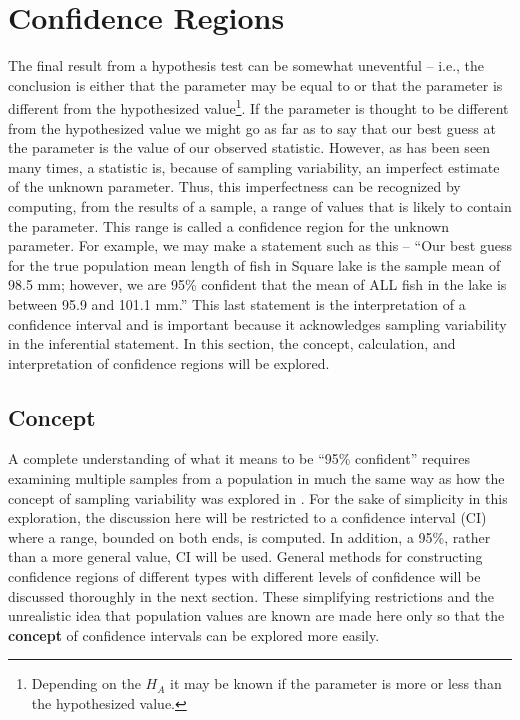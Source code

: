 \documentclass[10pt,openany]{book}\usepackage[]{graphicx}\usepackage[]{color}
\begin{document}
\section{Confidence Regions} \label{sect:CI}
The final result from a hypothesis test can be somewhat uneventful -- i.e., the conclusion is either that the parameter may be equal to or that the parameter is different from the hypothesized value\footnote{Depending on the $H_{A}$ it may be known if the parameter is more or less than the hypothesized value.}.  If the parameter is thought to be different from the hypothesized value we might go as far as to say that our best guess at the parameter is the value of our observed statistic.  However, as has been seen many times, a statistic is, because of sampling variability, an imperfect estimate of the unknown parameter.  Thus, this imperfectness can be recognized by computing, from the results of a sample, a range of values that is likely to contain the parameter.  This range is called a confidence region for the unknown parameter.  For example, we may make a statement such as this -- ``Our best guess for the true population mean length of fish in Square lake is the sample mean of 98.5 mm; however, we are 95\% confident that the mean of ALL fish in the lake is between 95.9 and 101.1 mm.''  This last statement is the interpretation of a confidence interval and is important because it acknowledges sampling variability in the inferential statement.  In this section, the concept, calculation, and interpretation of confidence regions will be explored.

\subsection{Concept} \label{sect:CIconcept}
A complete understanding of what it means to be ``95\% confident'' requires examining multiple samples from a population in much the same way as how the concept of sampling variability was explored in .  For the sake of simplicity in this exploration, the discussion here will be restricted to a confidence interval (CI) where a range, bounded on both ends, is computed.  In addition, a 95\%, rather than a more general value, CI will be used.  General methods for constructing confidence regions of different types with different levels of confidence will be discussed thoroughly in the next section.  These simplifying restrictions and the unrealistic idea that population values are known are made here only so that the \textbf{concept} of confidence intervals can be explored more easily.
\end{document}

